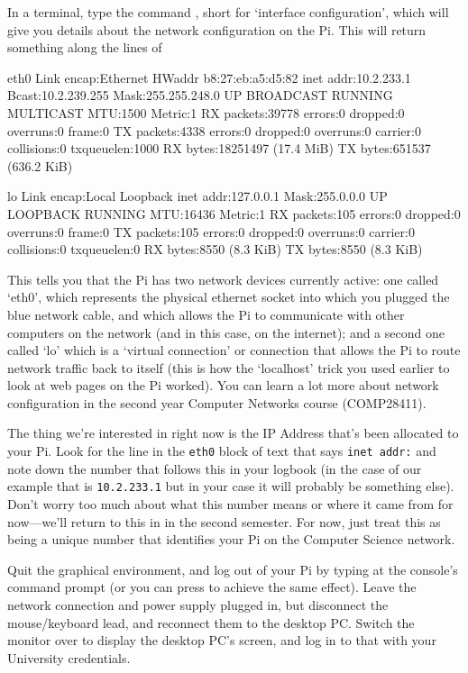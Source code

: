 In a terminal, type the command , short for `interface configuration', which will give you details about the network configuration on the Pi. This will return something along the lines of

\begin{ttoutenv}
eth0      Link encap:Ethernet  HWaddr b8:27:eb:a5:d5:82
          inet addr:10.2.233.1  Bcast:10.2.239.255  Mask:255.255.248.0
          UP BROADCAST RUNNING MULTICAST  MTU:1500  Metric:1
          RX packets:39778 errors:0 dropped:0 overruns:0 frame:0
          TX packets:4338 errors:0 dropped:0 overruns:0 carrier:0
          collisions:0 txqueuelen:1000
          RX bytes:18251497 (17.4 MiB)  TX bytes:651537 (636.2 KiB)

lo        Link encap:Local Loopback
          inet addr:127.0.0.1  Mask:255.0.0.0
          UP LOOPBACK RUNNING  MTU:16436  Metric:1
          RX packets:105 errors:0 dropped:0 overruns:0 frame:0
          TX packets:105 errors:0 dropped:0 overruns:0 carrier:0
          collisions:0 txqueuelen:0
          RX bytes:8550 (8.3 KiB)  TX bytes:8550 (8.3 KiB)
\end{ttoutenv}

This tells you that the Pi has two network devices currently active: one called `eth0', which represents the physical ethernet socket into which you plugged the blue network cable, and which allows the Pi to communicate with other computers on the network (and in this case, on the internet); and a second one called `lo' which is a `virtual connection' or  connection that allows the Pi to route network traffic back to itself (this is how the `localhost' trick you used earlier to look at web pages on the Pi worked). You can learn a lot more about network configuration in the second year Computer Networks course (COMP28411). 

The thing we're interested in right now is the IP Address that's been allocated to your Pi. Look for the line in the \texttt{eth0} block of text that says \texttt{inet addr:} and note down the number that follows this in your logbook (in the case of our example that is \texttt{10.2.233.1} but in your case it will probably be something else). Don't worry too much about what this number means or where it came from for now---we'll return to this in  in the second semester. For now, just treat this as being a unique number that identifies your Pi on the Computer Science network. 

Quit the graphical environment, and log out of your Pi by typing  at the console's command prompt (or you can press  to achieve the same effect). Leave the network connection and power supply plugged in, but disconnect the mouse/keyboard lead, and reconnect them to the desktop PC. Switch the monitor over to display the desktop PC's screen, and log in to that with your University credentials. 

